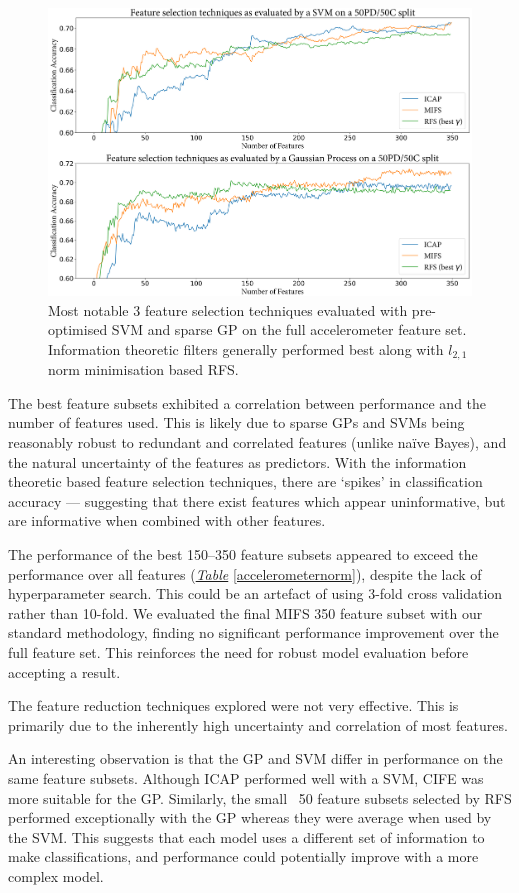 \documentclass[12pt, twoside]{book}
\begin{document}
\begin{figure}[!htb]
	\centering\centerline{\includegraphics[width=1.07\linewidth]{fsel_accel.png}}
	\caption{Most notable 3 feature selection techniques evaluated with pre-optimised SVM and sparse GP on the full accelerometer feature set. Information theoretic filters generally performed best along with $l_{2,1}$ norm minimisation based RFS.}
	\label{accelerometerfsel}
	\vspace{-0.5em}
\end{figure}

The best feature subsets exhibited a correlation between performance and the number of features used. This is likely due to sparse GPs and SVMs being reasonably robust to redundant and correlated features (unlike na\"{i}ve Bayes), and the natural uncertainty of the features as predictors. With the information theoretic based feature selection techniques, there are `spikes' in classification accuracy --- suggesting that there exist features which appear uninformative, but are informative when combined with other features. 

The performance of the best 150--350 feature subsets appeared to exceed the performance over all features (\textit{\hyperref[accelerometernorm]{Table}} \ref{accelerometernorm}), despite the lack of hyperparameter search. This could be an artefact of using 3-fold cross validation rather than 10-fold. We evaluated the final MIFS 350 feature subset with our standard methodology, finding no significant performance improvement over the full feature set. This reinforces the need for robust model evaluation before accepting a result.

\begin{highlight}
	The feature reduction techniques explored were not very effective. This is primarily due to the inherently high uncertainty and correlation of most features.
\end{highlight}
\newpage
\label{spensemble}
An interesting observation is that the GP and SVM differ in performance on the same feature subsets. Although ICAP performed well with a SVM, CIFE was more suitable for the GP. Similarly, the small ~50 feature subsets selected by RFS performed exceptionally with the GP whereas they were average when used by the SVM. This suggests that each model uses a different set of information to make classifications, and performance could potentially improve with a more complex model. 
\end{document}
